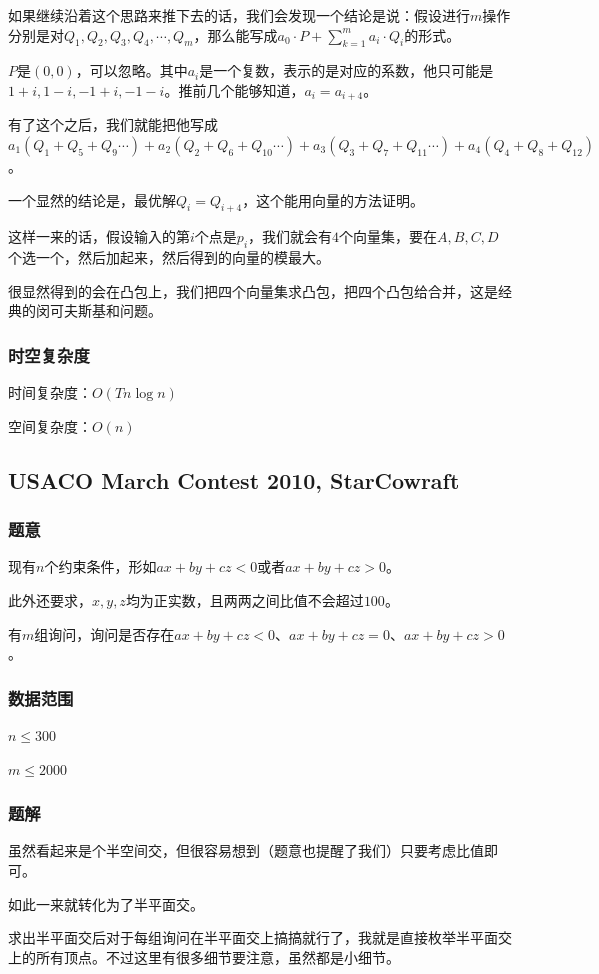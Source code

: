 \documentclass{ctexart}
\begin{document}
如果继续沿着这个思路来推下去的话，我们会发现一个结论是说：假设进行$m$操作分别是对$Q_1,Q_2,Q_3,Q_4,\cdots,Q_m$，那么能写成$a_0 \cdot P+\sum\limits_{k=1}^m a_i \cdot Q_i$的形式。

$P$是$(0,0)$，可以忽略。其中$a_i$是一个复数，表示的是对应的系数，他只可能是$1+i,1-i,-1+i,-1-i$。推前几个能够知道，$a_i=a_{i+4}$。

有了这个之后，我们就能把他写成$a_1(Q_1+Q_5+Q_9\cdots)+a_2(Q_2+Q_6+Q_{10}\cdots)+a_3(Q_3+Q_7+Q_{11}\cdots)+a_4(Q_4+Q_8+Q_{12})$。

一个显然的结论是，最优解$Q_i=Q_{i+4}$，这个能用向量的方法证明。

这样一来的话，假设输入的第$i$个点是$p_i$，我们就会有$4$个向量集，要在$A,B,C,D$个选一个，然后加起来，然后得到的向量的模最大。

很显然得到的会在凸包上，我们把四个向量集求凸包，把四个凸包给合并，这是经典的闵可夫斯基和问题。
\subsubsection{时空复杂度}
时间复杂度：$O(Tn \log n)$

空间复杂度：$O(n)$
\subsection{USACO March Contest 2010, StarCowraft}
\subsubsection{题意}
现有$n$个约束条件，形如$ax+by+cz<0$或者$ax+by+cz>0$。

此外还要求，$x,y,z$均为正实数，且两两之间比值不会超过$100$。

有$m$组询问，询问是否存在$ax+by+cz<0$、$ax+by+cz=0$、$ax+by+cz>0$。
\subsubsection{数据范围}
$n \le 300$

$m \le 2000$
\subsubsection{题解}
虽然看起来是个半空间交，但很容易想到（题意也提醒了我们）只要考虑比值即可。

如此一来就转化为了半平面交。

求出半平面交后对于每组询问在半平面交上搞搞就行了，我就是直接枚举半平面交上的所有顶点。不过这里有很多细节要注意，虽然都是小细节。
\end{document}
